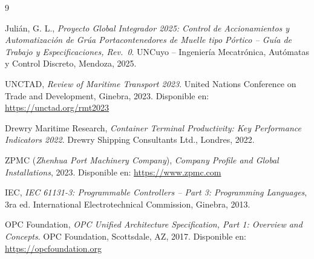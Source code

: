 \documentclass[12pt, a4paper]{article}
\begin{document}
\newpage
{}
\begin{thebibliography}{9}

    Julián, G. L.,
    \textit{Proyecto Global Integrador 2025: Control de Accionamientos y Automatización
    de Grúa Portacontenedores de Muelle tipo Pórtico -- Guía de Trabajo y Especificaciones,
    Rev.~0}.
    UNCuyo -- Ingeniería Mecatrónica, Autómatas y Control Discreto, Mendoza, 2025.

    UNCTAD,
    \textit{Review of Maritime Transport 2023}.
    United Nations Conference on Trade and Development, Ginebra, 2023.
    Disponible en: \url{https://unctad.org/rmt2023}

    Drewry Maritime Research,
    \textit{Container Terminal Productivity: Key Performance Indicators 2022}.
    Drewry Shipping Consultants Ltd., Londres, 2022.

    ZPMC (\textit{Zhenhua Port Machinery Company}),
    \textit{Company Profile and Global Installations}, 2023.
    Disponible en: \url{https://www.zpmc.com}

    IEC,
    \textit{IEC 61131-3: Programmable Controllers -- Part 3: Programming Languages},
    3ra ed.
    International Electrotechnical Commission, Ginebra, 2013.

    OPC Foundation,
    \textit{OPC Unified Architecture Specification, Part 1: Overview and Concepts}.
    OPC Foundation, Scottsdale, AZ, 2017.
    Disponible en: \url{https://opcfoundation.org}

\end{thebibliography}
\end{document}
